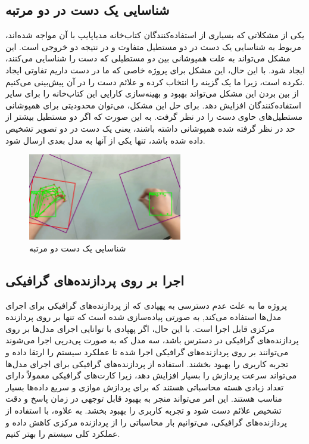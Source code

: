 \subsection{شناسایی یک دست در دو مرتبه}
یکی از مشکلاتی که بسیاری از استفاده‌کنندگان کتاب‌خانه مدیاپایپ با آن مواجه شده‌اند، مربوط به شناسایی یک دست در دو مستطیل متفاوت و در نتیجه دو خروجی است. این مشکل می‌تواند به علت همپوشانی بین دو مستطیلی که دست را 
شناسایی می‌کنند، ایجاد شود. با این حال، این مشکل برای پروژه خاصی که ما در دست داریم تفاوتی ایجاد نکرده است، زیرا ما یک گزینه را انتخاب کرده و علائم دست را در آن پیش‌بینی می‌کنیم.
\\
از بین بردن این مشکل می‌تواند بهبود و بهینه‌سازی کارایی این کتاب‌خانه را برای سایر استفاده‌کنندگان افزایش دهد. برای حل این مشکل، می‌توان محدودیتی برای همپوشانی مستطیل‌های حاوی دست را در نظر گرفت. به این صورت که اگر دو مستطیل بیشتر از حد در نظر گرفته شده 
همپوشانی داشته باشند، یعنی یک دست در دو تصویر تشخیص داده شده باشد، تنها یکی از آنها به مدل بعدی ارسال شود.
\begin{figure}[h]
    \centering
    \includegraphics[width=0.6\textwidth]{multi_boxes.png}
    \caption{شناسایی یک دست دو مرتبه}
\end{figure}


\subsection{اجرا بر روی پردازنده‌های گرافیکی }
پروژه ما  به علت عدم دسترسی به پهپادی که از پردازنده‌های گرافیکی برای اجرای مدل‌ها استفاده می‌کند, به صورتی پیاده‌سازی شده است که تنها بر روی پردازنده مرکزی قابل اجرا است. با این حال، اگر پهپادی با توانایی اجرای مدل‌ها بر روی 
پردازنده‌های گرافیکی در دسترس باشد، سه مدل که به صورت پی‌در‌پی اجرا می‌شوند می‌توانند بر روی پردازنده‌های گرافیکی اجرا شده تا عملکرد سیستم را ارتقا داده و تجربه کاربری را بهبود بخشند. استفاده از پردازنده‌های گرافیکی برای اجرای مدل‌ها می‌تواند 
سرعت پردازش را بسیار افزایش دهد، زیرا کارت‌های گرافیکی معمولاً دارای تعداد زیادی هسته محاسباتی هستند که برای پردازش موازی و سریع داده‌ها بسیار مناسب هستند. این امر می‌تواند منجر به بهبود قابل توجهی در زمان پاسخ و دقت 
تشخیص علائم دست شود و تجربه کاربری را بهبود بخشد. به علاوه، با استفاده از پردازنده‌های گرافیکی، می‌توانیم بار محاسباتی را از پردازنده مرکزی کاهش داده و عملکرد کلی سیستم را بهتر کنیم.

